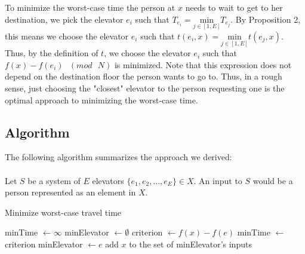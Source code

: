 \documentclass[letterpaper]{article} %
\begin{document}
To minimize the worst-case time the person at $x$ needs to wait to get to her destination, we pick the elevator $e_i$ such that $T_{e_i} = \underset{j \in [1, E]}{\mathrm{min}} T_{e_j}$. By Proposition 2, this means we choose the elevator $e_i$ such that $t(e_i, x) = \underset{j \in [1, E]}{\mathrm{min}} t(e_j, x)$. Thus, by the definition of $t$, we choose the elevator $e_i$ such that $f(x) - f(e_i) \text{ } (mod \text{ } N)$ is minimized. Note that this expression does not depend on the destination floor the person wants to go to. Thus, in a rough sense, just choosing the "closest" elevator to the person requesting one is the optimal approach to minimizing the worst-case time. 

\subsection{Algorithm}
The following algorithm summarizes the approach we derived:\\\\
Let $S$ be a system of $E$ elevators $\{e_1, e_2, ... , e_E\} \in X$. An input to $S$ would be a person represented as an element in $X$.\\
\begin{algorithm}
\caption{Minimize worst-case travel time}\label{euclid}
\begin{algorithmic}[1]
	\State minTime $\leftarrow \infty$
	\State minElevator $\leftarrow \emptyset$
		\State criterion $\leftarrow f(x) - f(e)$
			\State minTime $\leftarrow$ criterion
			\State minElevator $\leftarrow e$
		\EndIf
	\EndFor
	\State add $x$ to the set of minElevator's inputs
\EndFor
\EndProcedure
\end{algorithmic}
\end{algorithm}
\end{document}

